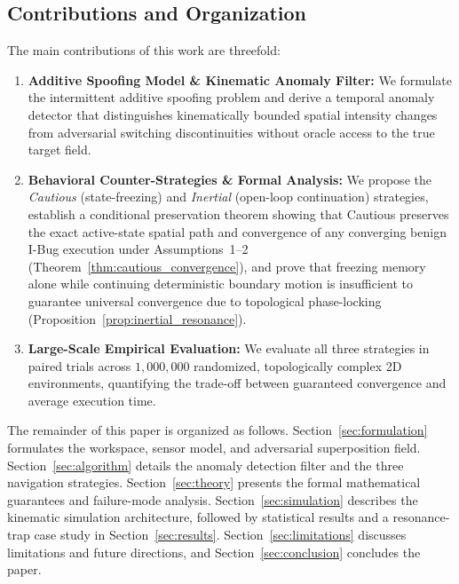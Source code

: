 \documentclass[12pt, a4paper]{article}
\begin{document}
\subsection{Contributions and Organization}
The main contributions of this work are threefold:
\begin{enumerate}
    \item \textbf{Additive Spoofing Model \& Kinematic Anomaly Filter:} We formulate the intermittent additive spoofing problem and derive a temporal anomaly detector that distinguishes kinematically bounded spatial intensity changes from adversarial switching discontinuities without oracle access to the true target field.
    \item \textbf{Behavioral Counter-Strategies \& Formal Analysis:} We propose the \textit{Cautious} (state-freezing) and \textit{Inertial} (open-loop continuation) strategies, establish a conditional preservation theorem showing that Cautious preserves the exact active-state spatial path and convergence of any converging benign I-Bug execution under Assumptions~1--2 (Theorem~\ref{thm:cautious_convergence}), and prove that freezing memory alone while continuing deterministic boundary motion is insufficient to guarantee universal convergence due to topological phase-locking (Proposition~\ref{prop:inertial_resonance}).
    \item \textbf{Large-Scale Empirical Evaluation:} We evaluate all three strategies in paired trials across $1,000,000$ randomized, topologically complex 2D environments, quantifying the trade-off between guaranteed convergence and average execution time.
\end{enumerate}

The remainder of this paper is organized as follows. Section~\ref{sec:formulation} formulates the workspace, sensor model, and adversarial superposition field. Section~\ref{sec:algorithm} details the anomaly detection filter and the three navigation strategies. Section~\ref{sec:theory} presents the formal mathematical guarantees and failure-mode analysis. Section~\ref{sec:simulation} describes the kinematic simulation architecture, followed by statistical results and a resonance-trap case study in Section~\ref{sec:results}. Section~\ref{sec:limitations} discusses limitations and future directions, and Section~\ref{sec:conclusion} concludes the paper.
\end{document}
